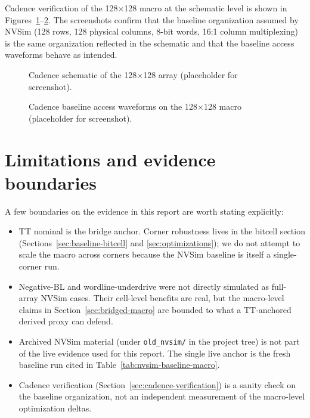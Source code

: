 \documentclass[pdflatex,sn-mathphys-num,iicol]{sn-jnl}%
\theoremstyle{thmstyleone}%
\theoremstyle{thmstyletwo}%
\theoremstyle{thmstylethree}%
\begin{document}
Cadence verification of the 128$\times$128 macro at the schematic level is shown in Figures~\ref{fig:cadence-array}--\ref{fig:cadence-waveforms}. The screenshots confirm that the baseline organization assumed by NVSim (128 rows, 128 physical columns, 8-bit words, 16:1 column multiplexing) is the same organization reflected in the schematic and that the baseline access waveforms behave as intended.

\begin{figure}[t]
\centering
\fbox{\rule{0pt}{0.32\textheight}\rule{0.86\columnwidth}{0pt}}
\caption{Cadence schematic of the 128$\times$128 array (placeholder for screenshot).}\label{fig:cadence-array}
\end{figure}

\begin{figure}[t]
\centering
\fbox{\rule{0pt}{0.32\textheight}\rule{0.86\columnwidth}{0pt}}
\caption{Cadence baseline access waveforms on the 128$\times$128 macro (placeholder for screenshot).}\label{fig:cadence-waveforms}
\end{figure}

\section{Limitations and evidence boundaries}\label{sec:limitations}

A few boundaries on the evidence in this report are worth stating explicitly:

\begin{itemize}
    \item TT nominal is the bridge anchor. Corner robustness lives in the bitcell section (Sections~\ref{sec:baseline-bitcell} and \ref{sec:optimizations}); we do not attempt to scale the macro across corners because the NVSim baseline is itself a single-corner run.
    \item Negative-BL and wordline-underdrive were not directly simulated as full-array NVSim cases. Their cell-level benefits are real, but the macro-level claims in Section~\ref{sec:bridged-macro} are bounded to what a TT-anchored derived proxy can defend.
    \item Archived NVSim material (under \texttt{old\_nvsim/} in the project tree) is not part of the live evidence used for this report. The single live anchor is the fresh baseline run cited in Table~\ref{tab:nvsim-baseline-macro}.
    \item Cadence verification (Section~\ref{sec:cadence-verification}) is a sanity check on the baseline organization, not an independent measurement of the macro-level optimization deltas.
\end{itemize}
\end{document}
